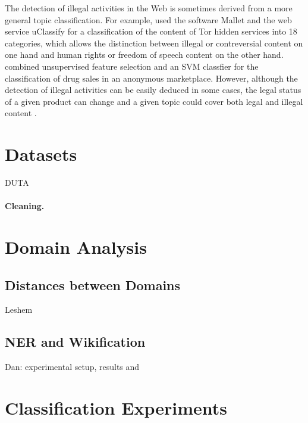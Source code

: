 \documentclass[11pt,a4paper]{article}
\begin{document}
The detection of illegal activities in the Web is sometimes derived from a more general topic classification. For example, \citet{Biryukov14} used the software Mallet \citep{McCallum02} and the web service uClassify \citep{Kagstrom13} for a classification of the content of Tor hidden services into 18 categories, which allows the distinction between illegal or contreversial content on one hand and human rights or freedom of speech content on the other hand. \citet{GraczykKinningham15} combined unsupervised feature selection and an SVM classfier for the classification of drug sales in an anonymous marketplace. However, although the detection of illegal activities can be easily deduced in some cases, the legal status of a given product can change \citep{GraczykKinningham15} and a given topic could cover both legal and illegal content \citep{AlNabki17,Avarikioti18}.





\section{Datasets}

DUTA \citep{AlNabki17}

\paragraph{Cleaning.}

\section{Domain Analysis}

\subsection{Distances between Domains}

Leshem



\subsection{NER and Wikification}

Dan: experimental setup, results and 

\section{Classification Experiments}
\end{document}
